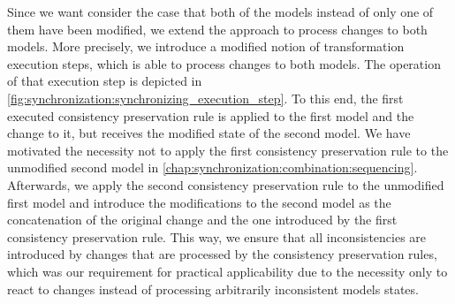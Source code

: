 Since we want consider the case that both of the models instead of only one of them have been modified, we extend the approach to process changes to both models.
More precisely, we introduce a modified notion of transformation execution steps, which is able to process changes to both models.
The operation of that execution step is depicted in \autoref{fig:synchronization:synchronizing_execution_step}.
To this end, the first executed consistency preservation rule is applied to the first model and the change to it, but receives the modified state of the second model.
We have motivated the necessity not to apply the first consistency preservation rule to the unmodified second model in \autoref{chap:synchronization:combination:sequencing}.
Afterwards, we apply the second consistency preservation rule to the unmodified first model and introduce the modifications to the second model as the concatenation of the original change and the one introduced by the first consistency preservation rule.
This way, we ensure that all inconsistencies are introduced by changes that are processed by the consistency preservation rules, which was our requirement for practical applicability due to the necessity only to react to changes instead of processing arbitrarily inconsistent models states.

